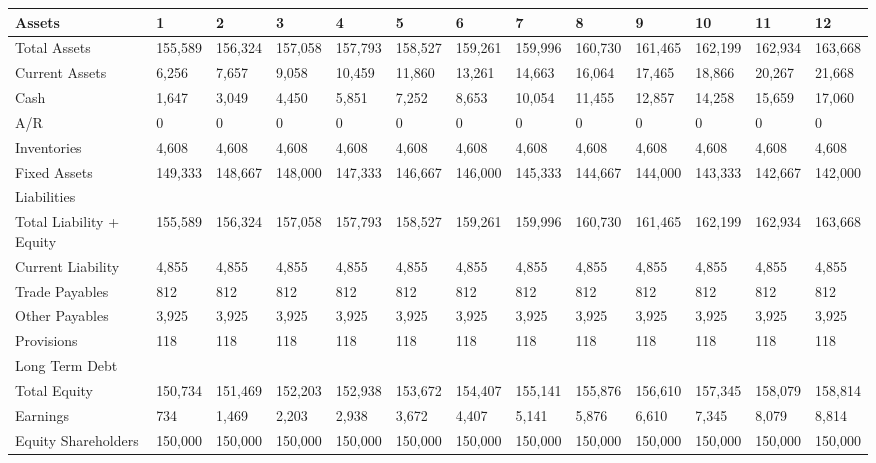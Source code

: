 \begin{tabular}{lllllllllllll}
\hline
 Assets                   & 1       & 2       & 3       & 4       & 5       & 6       & 7       & 8       & 9       & 10      & 11      & 12      \\
\hline
 Total Assets             & 155,589 & 156,324 & 157,058 & 157,793 & 158,527 & 159,261 & 159,996 & 160,730 & 161,465 & 162,199 & 162,934 & 163,668 \\
 Current Assets           & 6,256   & 7,657   & 9,058   & 10,459  & 11,860  & 13,261  & 14,663  & 16,064  & 17,465  & 18,866  & 20,267  & 21,668  \\
 Cash                     & 1,647   & 3,049   & 4,450   & 5,851   & 7,252   & 8,653   & 10,054  & 11,455  & 12,857  & 14,258  & 15,659  & 17,060  \\
 A/R                      & 0       & 0       & 0       & 0       & 0       & 0       & 0       & 0       & 0       & 0       & 0       & 0       \\
 Inventories              & 4,608   & 4,608   & 4,608   & 4,608   & 4,608   & 4,608   & 4,608   & 4,608   & 4,608   & 4,608   & 4,608   & 4,608   \\
 Fixed Assets             & 149,333 & 148,667 & 148,000 & 147,333 & 146,667 & 146,000 & 145,333 & 144,667 & 144,000 & 143,333 & 142,667 & 142,000 \\
 Liabilities              &         &         &         &         &         &         &         &         &         &         &         &         \\
 Total Liability + Equity & 155,589 & 156,324 & 157,058 & 157,793 & 158,527 & 159,261 & 159,996 & 160,730 & 161,465 & 162,199 & 162,934 & 163,668 \\
 Current Liability        & 4,855   & 4,855   & 4,855   & 4,855   & 4,855   & 4,855   & 4,855   & 4,855   & 4,855   & 4,855   & 4,855   & 4,855   \\
 Trade Payables           & 812     & 812     & 812     & 812     & 812     & 812     & 812     & 812     & 812     & 812     & 812     & 812     \\
 Other Payables           & 3,925   & 3,925   & 3,925   & 3,925   & 3,925   & 3,925   & 3,925   & 3,925   & 3,925   & 3,925   & 3,925   & 3,925   \\
 Provisions               & 118     & 118     & 118     & 118     & 118     & 118     & 118     & 118     & 118     & 118     & 118     & 118     \\
 Long Term Debt           &         &         &         &         &         &         &         &         &         &         &         &         \\
 Total Equity             & 150,734 & 151,469 & 152,203 & 152,938 & 153,672 & 154,407 & 155,141 & 155,876 & 156,610 & 157,345 & 158,079 & 158,814 \\
 Earnings                 & 734     & 1,469   & 2,203   & 2,938   & 3,672   & 4,407   & 5,141   & 5,876   & 6,610   & 7,345   & 8,079   & 8,814   \\
 Equity Shareholders      & 150,000 & 150,000 & 150,000 & 150,000 & 150,000 & 150,000 & 150,000 & 150,000 & 150,000 & 150,000 & 150,000 & 150,000 \\
\hline
\end{tabular}